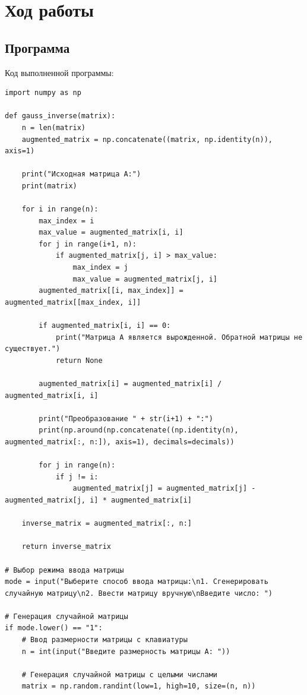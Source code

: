 \documentclass[12pt,a4paper]{scrartcl}
\begin{document}
\section{Ход работы}
\subsection{Программа}
Код выполненной программы:
\begin{verbatim}
import numpy as np

def gauss_inverse(matrix):
    n = len(matrix)
    augmented_matrix = np.concatenate((matrix, np.identity(n)), axis=1)

    print("Исходная матрица A:")
    print(matrix)

    for i in range(n):
        max_index = i
        max_value = augmented_matrix[i, i]
        for j in range(i+1, n):
            if augmented_matrix[j, i] > max_value:
                max_index = j
                max_value = augmented_matrix[j, i]
        augmented_matrix[[i, max_index]] = augmented_matrix[[max_index, i]]
        
        if augmented_matrix[i, i] == 0:
            print("Матрица A является вырожденной. Обратной матрицы не существует.")
            return None
        
        augmented_matrix[i] = augmented_matrix[i] / augmented_matrix[i, i]
        
        print("Преобразование " + str(i+1) + ":")
        print(np.around(np.concatenate((np.identity(n), augmented_matrix[:, n:]), axis=1), decimals=decimals))
        
        for j in range(n):
            if j != i:
                augmented_matrix[j] = augmented_matrix[j] - augmented_matrix[j, i] * augmented_matrix[i]
    
    inverse_matrix = augmented_matrix[:, n:]
    
    return inverse_matrix

# Выбор режима ввода матрицы
mode = input("Выберите способ ввода матрицы:\n1. Сгенерировать случайную матрицу\n2. Ввести матрицу вручную\nВведите число: ")

# Генерация случайной матрицы
if mode.lower() == "1":
    # Ввод размерности матрицы с клавиатуры
    n = int(input("Введите размерность матрицы A: "))
    
    # Генерация случайной матрицы с целыми числами
    matrix = np.random.randint(low=1, high=10, size=(n, n))
    

\end{verbatim}
\end{document}
